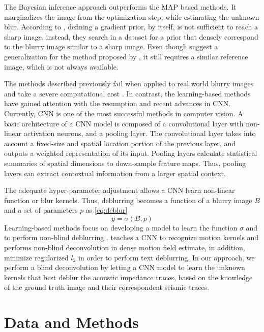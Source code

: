 \documentclass[journal]{IEEEtran}
\begin{document}
The Bayesian inference approach \cite{Levin} outperforms the MAP based
methods. It marginalizes the image from the optimization step, while
estimating the unknown blur.
According to \cite{Hacohen13}, defining a gradient prior, by itself,
is not sufficient to reach a sharp image, instead, they search in a
dataset for a prior that densely correspond to the blurry image similar
to a sharp image. Even though \cite{Pan2014} suggest a generalization
for the method proposed by \cite{Hacohen13}, it still requires a similar
reference image, which is not always available.

The methods described previously fail when applied to real world
blurry images \cite{Lai2016} and take a severe computational cost
\cite{Chakrabarti2016}. In contrast, the learning-based methods
have gained attention with the resumption and recent advances in
CNN. 
Currently, CNN is one of the most successful methods in computer vision.
A basic architecture of a CNN model is composed of a convolutional layer
with non-linear activation neurons, and a pooling layer.
The convolutional layer takes into account a fixed-size and spatial
location portion of the previous layer, and outputs
a weighted representation of its input.
Pooling layers calculate statistical summaries of spatial dimensions
to down-sample feature maps. Thus, pooling layers can extract
contextual information from a larger spatial context.

The adequate hyper-parameter adjustment allows a CNN learn non-linear
function or blur kernels. Thus, deblurring becomes a function of
a blurry image $B$ and a set of parameters $p$ as \ref{eq:deblur}
\begin{equation}
 y = \sigma(B,p)
 \label{eq:deblur}
\end{equation}
Learning-based methods focus on developing a model to learn the function
$\sigma$ and to perform non-blind deblurring \cite{Chakrabarti2016}.
\cite{Sun2015} teaches a CNN to recognize motion kernels and performs non-blind
deconvolution in dense motion field estimate, in addition, \cite{Hradis2015}
minimize regularized $l_2$ in order to perform text deblurring.
In our approach, we perform a blind deconvolution by letting a CNN model
to learn the unknown kernels that best deblur the acoustic impedance
traces, based on the knowledge of the ground truth image and their
correspondent seismic traces.

\section{Data and Methods}\label{Method}
\end{document}
